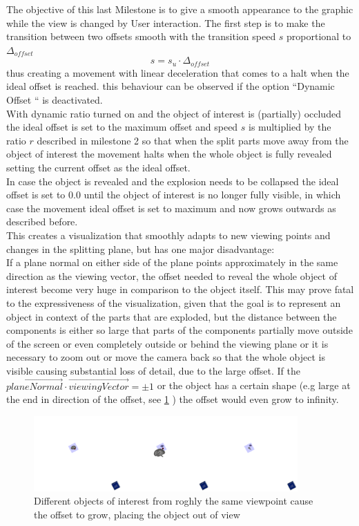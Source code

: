 The objective of this last Milestone is to give a smooth appearance to the graphic while the view is changed by User interaction. The first step is to make the transition between two offsets smooth with the transition speed $s$ proportional to $\Delta_{offset}$
\begin{equation}
	s=s_u \cdot \Delta_{offset}
\end{equation}
thus creating a movement with linear deceleration that comes to a halt when the ideal offset is reached. this behaviour can be observed if the option ``Dynamic Offset `` is deactivated.\\
With dynamic ratio turned on and the object of interest is (partially) occluded the ideal offset is set to the maximum  offset and speed $s$ is multiplied by the ratio $r$ described in milestone 2 so that when the split parts move away from the object of interest the movement halts when the whole object is fully revealed setting the current offset as the ideal offset.\\
In case the object is revealed and the explosion needs to be collapsed the ideal offset is set to 0.0 until the object of interest is no longer fully visible, in which case the movement ideal offset is set to maximum and now grows outwards as described before.\\
This creates a visualization that smoothly adapts to new viewing points and changes in the splitting plane, but has one major disadvantage:\\
If a plane normal on either side of the plane points approximately in the same direction as the viewing vector,  the offset needed to reveal the whole object of interest become very huge in comparison to the object itself. This may prove fatal to the expressiveness of the visualization, given that the goal is to represent an object in context of the parts that are exploded, but the distance between the components is either so large that parts of the components partially move outside of the screen or even completely outside or behind the viewing plane or it is necessary to zoom out or move the camera back so that the whole object is visible causing substantial loss of detail, due to the large offset. If the $\vec{planeNormal} \cdot \vec{viewingVector} = \pm1$ or the object has a certain shape (e.g large at the end in direction of the offset, see  \ref{fig:infinity}
) the offset would even grow to infinity.\\
\begin{figure}[tb]
	\centering
	\includegraphics[width=0.9\textwidth]{chapters/figures/infinity}
	\caption{Different objects of interest from roghly the same viewpoint cause the offset to grow, placing the object out of view}
	\label{fig:infinity}
\end{figure}
